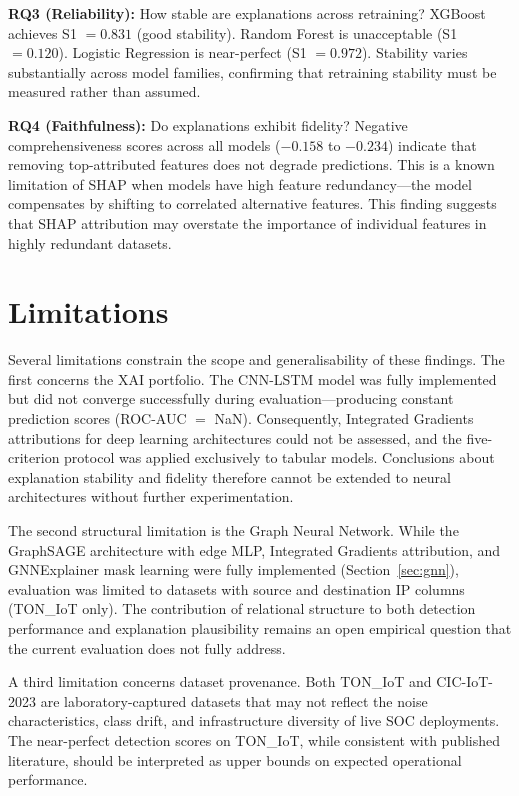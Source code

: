 \documentclass[12pt,a4paper]{report}
\begin{document}
\textbf{RQ3 (Reliability):} How stable are explanations across retraining? XGBoost achieves S1 $= 0.831$ (good stability). Random Forest is unacceptable (S1 $= 0.120$). Logistic Regression is near-perfect (S1 $= 0.972$). Stability varies substantially across model families, confirming that retraining stability must be measured rather than assumed.

\textbf{RQ4 (Faithfulness):} Do explanations exhibit fidelity? Negative comprehensiveness scores across all models ($-0.158$ to $-0.234$) indicate that removing top-attributed features does not degrade predictions. This is a known limitation of SHAP when models have high feature redundancy---the model compensates by shifting to correlated alternative features. This finding suggests that SHAP attribution may overstate the importance of individual features in highly redundant datasets.

\section{Limitations}
\label{sec:limitations}

Several limitations constrain the scope and generalisability of these findings. The first concerns the XAI portfolio. The CNN-LSTM model was fully implemented but did not converge successfully during evaluation---producing constant prediction scores (ROC-AUC $=$ NaN). Consequently, Integrated Gradients attributions for deep learning architectures could not be assessed, and the five-criterion protocol was applied exclusively to tabular models. Conclusions about explanation stability and fidelity therefore cannot be extended to neural architectures without further experimentation.

The second structural limitation is the Graph Neural Network. While the GraphSAGE architecture with edge MLP, Integrated Gradients attribution, and GNNExplainer mask learning were fully implemented (Section~\ref{sec:gnn}), evaluation was limited to datasets with source and destination IP columns (TON\_IoT only). The contribution of relational structure to both detection performance and explanation plausibility remains an open empirical question that the current evaluation does not fully address.

A third limitation concerns dataset provenance. Both TON\_IoT and CIC-IoT-2023 are laboratory-captured datasets that may not reflect the noise characteristics, class drift, and infrastructure diversity of live SOC deployments. The near-perfect detection scores on TON\_IoT, while consistent with published literature, should be interpreted as upper bounds on expected operational performance.
\end{document}
